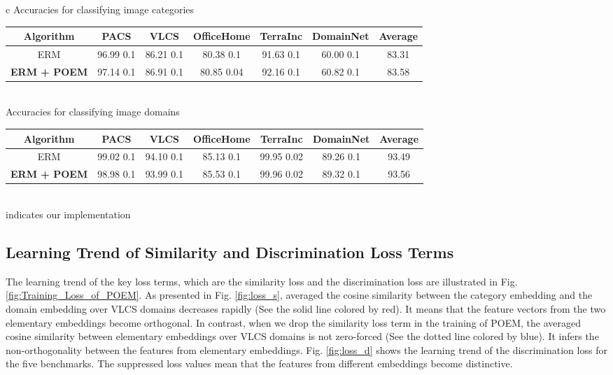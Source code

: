 \documentclass[letterpaper]{article} \usepackage{aaai23}  \usepackage{times}  \usepackage{helvet}  \usepackage{courier}  \usepackage[hyphens]{url}  \usepackage{graphicx} \urlstyle{rm} \def\UrlFont{\rm}  \usepackage{natbib}  \usepackage{caption} \frenchspacing  \setlength{\pdfpagewidth}{8.5in}  \setlength{\pdfpageheight}{11in}  \usepackage[labelsep=period]{caption}
\begin{document}
\begin{table*}[!htb]
\centering
	\begin{tabular}{c}
		Accuracies for classifying image categories\\
		\begin{tabular}{cccccc|c}
			\toprule
			Algorithm & PACS & VLCS & OfficeHome & TerraInc & DomainNet & Average\\
			\midrule
			ERM & 96.99  0.1 & 86.21  0.1 & 80.38  0.1 & 91.63  0.1 & 60.00  0.1 & 83.31\\
\midrule
			\textbf{ERM + POEM} & 97.14  0.1 & 86.91  0.1 & 80.85  0.04 & 92.16  0.1 & 60.82  0.1 & 83.58\\
\midrule
		\end{tabular}\\
		Accuracies for classifying image domains\\
		\begin{tabular}{cccccc|c}
			\toprule
			Algorithm & PACS & VLCS & OfficeHome & TerraInc & DomainNet & Average\\
			\midrule
			ERM & 99.02  0.1 & 94.10  0.1 & 85.13  0.1 & 99.95  0.02& 89.26  0.1 & 93.49\\
			\midrule
			\textbf{ERM + POEM} & 98.98  0.1 & 93.99  0.1 & 85.53  0.1 & 99.96  0.02& 89.32  0.1 & 93.56\\
			\hline
		\end{tabular}
	\end{tabular}
    \caption{Validation accuracies on source domains}
	\footnotesize{\\ indicates our implementation}\\
	\label{tab:source_performance}
\end{table*}


\subsection{Learning Trend of Similarity and Discrimination Loss Terms}
The learning trend of the key loss terms, which are the similarity loss  and the discrimination loss  are illustrated in Fig. \ref{fig:Training_Loss_of_POEM}. As presented in Fig. \ref{fig:loss_s}, averaged the cosine similarity between the category embedding and the domain embedding over VLCS domains decreases rapidly (See the solid line colored by red). It means that the feature vectors from the two elementary embeddings become orthogonal. In contrast, when we drop the similarity loss term in the training of POEM, the averaged cosine similarity between elementary embeddings over VLCS domains is not zero-forced (See the dotted line colored by blue). It infers the non-orthogonality between the features from elementary embeddings. 
Fig. \ref{fig:loss_d} shows the learning trend of the discrimination loss for the five benchmarks. The suppressed loss values mean that the features from different embeddings become distinctive. 
\end{document}
